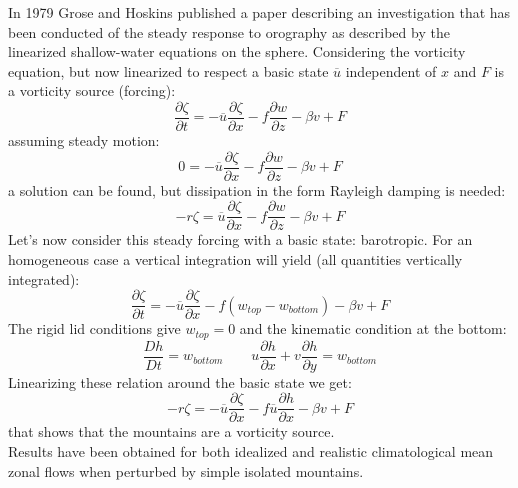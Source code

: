 In 1979 Grose and Hoskins\cite{grose78} published a paper describing an investigation that has been conducted of the steady response to orography as described by the linearized shallow-water equations on the sphere. Considering the vorticity equation, but now linearized to respect a basic state $\overline{u}$ independent of $x$ and $F$ is a vorticity source (forcing):
\begin{equation}\label{eq.vortlinearized}
	\frac{\partial\zeta}{\partial t}=-\overline{u}\frac{\partial\zeta}{\partial x}-f\frac{\partial w}{\partial z}-\beta v+F
\end{equation}
assuming steady motion:
\begin{equation}
	0=-\overline{u}\frac{\partial\zeta}{\partial x}-f\frac{\partial w}{\partial z}-\beta v+F
\end{equation}
a solution can be found, but dissipation in the form Rayleigh damping is needed:
\begin{equation}
	-r\zeta=\overline{u}\frac{\partial\zeta}{\partial x}-f\frac{\partial w}{\partial z}-\beta v+F
\end{equation}
Let's now consider this steady forcing with a basic state: barotropic. For an homogeneous case a vertical integration will yield (all quantities vertically integrated):
\begin{equation}
	\frac{\partial\zeta}{\partial t}=-\overline{u}\frac{\partial\zeta}{\partial x}-f(w_{top}-w_{bottom})-\beta v+F
\end{equation}
The rigid lid conditions give $w_{top}=0$ and the kinematic condition at the bottom:
$$\frac{Dh}{Dt}=w_{bottom}\qquad u\frac{\partial h}{\partial x}+v\frac{\partial h}{\partial y}=w_{bottom}$$
Linearizing these relation around the basic state we get:
\begin{equation}
	- r\zeta=-\overline{u}\frac{\partial\zeta}{\partial x}-f\overline{u}\frac{\partial h}{\partial x}-\beta v+F
\end{equation}
that shows that the mountains are a vorticity source. \\

Results have been obtained for both idealized and realistic climatological mean zonal flows when perturbed by simple isolated mountains.


